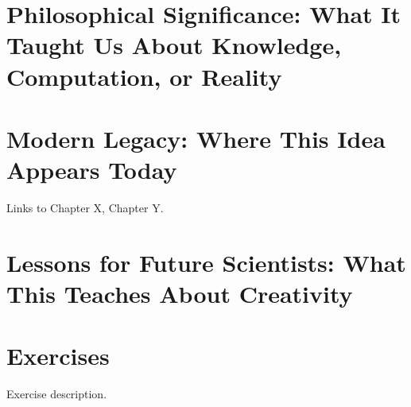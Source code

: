 {%

\section{Philosophical Significance: What It Taught Us About Knowledge, Computation, or Reality}
\label{sec:[CHAPTER_LABEL]:philosophy}


\section{Modern Legacy: Where This Idea Appears Today}
\label{sec:[CHAPTER_LABEL]:legacy}


Links to Chapter X, Chapter Y.

\section{Lessons for Future Scientists: What This Teaches About Creativity}
\label{sec:[CHAPTER_LABEL]:lessons}


\section{Exercises}
\label{sec:[CHAPTER_LABEL]:exercises}

\begin{exercise}[Basic]
Exercise description.
\end{exercise}

}
